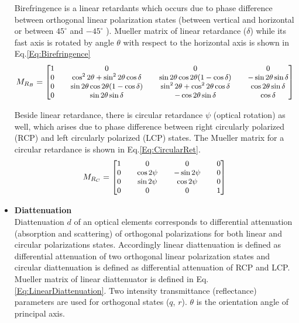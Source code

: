 \documentclass[oneside,a4,12p]{report} %
\begin{document}
\begin{itemize}
	Birefringence is a linear retardants which occurs due to phase difference between orthogonal linear polarization states (between vertical and horizontal or between $45^{\circ}$ and $-45^{\circ}$ ). Mueller matrix of linear retardance ($\delta$) while its fast axis is rotated by angle $\theta$ with respect to the horizontal axis is shown in Eq.\ref{Eq:Birefringence}
	\begin{equation}\label{Eq:Birefringence}
	\small
	M_{R_{B}}=\begin{bmatrix}
	1 &&  0 &&  0  && 0\\
	0 && \cos^{2}2\theta +\sin^{2}2\theta\cos\delta && \sin 2\theta\cos 2\theta(1-\cos\delta) &&  -\sin 2\theta \sin \delta\\ 
	0 &&\sin 2\theta\cos 2\theta(1-\cos\delta) && \sin^{2}2\theta +\cos^{2}2\theta\cos\delta && \cos 2\theta \sin \delta\\
	 0 && \sin 2\theta \sin \delta && -\cos 2\theta \sin \delta && \cos\delta
	\end{bmatrix}
	\end{equation}	

	Beside linear retardance, there is circular retardance $\psi$ (optical rotation) as well, which arises due to phase difference between right circularly polarized (RCP) and left circularly polarized (LCP) states. The Mueller matrix for a circular retardance is shown in Eq.\ref{Eq:CircularRet}.
	\begin{equation}\label{Eq:CircularRet}
	\small
	M_{R_{C}}=\begin{bmatrix}
	1 &&  0 &&  0  && 0\\
	0 && \cos 2\psi && -\sin 2\psi &&  0\\ 
	0 && \sin 2\psi && \cos 2\psi && 0\\
	 0 && 0 && 0 && 1
	\end{bmatrix}
	\end{equation}
	
	\item \textbf{Diattenuation}\\
	Diattenuation $d$ of an optical elements corresponds to differential attenuation (absorption and scattering) of orthogonal polarizations for both linear and circular polarizations states. Accordingly linear diattenuation is defined as differential attenuation of two orthogonal linear polarization states and circular diattenuation is defined as differential attenuation of RCP and LCP. Mueller matrix of linear diattenuator is defined in Eq.\ref{Eq:LinearDiattenuation}. Two intensity transmittance (reflectance) parameters are used for orthogonal states ($q$, $r$). $\theta$ is the orientation angle of principal axis. 
	

\end{itemize}
\end{document}

